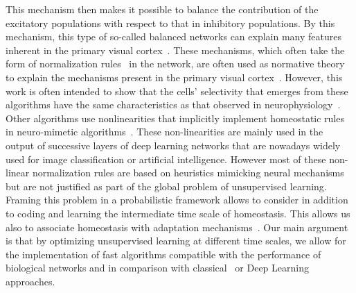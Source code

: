 \documentclass[a4paper, 11pt, draft]{article} %
\begin{document}
This mechanism then makes it possible to balance the contribution of the excitatory populations with respect to that in inhibitory populations. By this mechanism, this type of so-called balanced networks can explain many features inherent in the primary visual cortex~\citep{Hansel12}. These mechanisms, which often take the form of normalization rules~\citep{Schwartz01} in the network, are often used as normative theory to explain the mechanisms present in the primary visual cortex~\citep{Carandini12}. However, this work is often intended to show that the cells' selectivity that emerges from these algorithms have the same characteristics as that observed in neurophysiology~\citep{Ringach02,Rehn07, Loxley17}. Other algorithms use nonlinearities that implicitly implement homeostatic rules in neuro-mimetic algorithms~\citep{Brito16}. These non-linearities are mainly used in the output of successive layers of deep learning networks that are nowadays widely used for image classification or artificial intelligence. However most of these non-linear normalization rules are based on heuristics mimicking neural mechanisms but are not justified as part of the global problem of unsupervised learning. Framing this problem in a probabilistic framework allows to consider in addition to coding and learning the intermediate time scale of homeostasis. This allows us also to associate homeostasis with adaptation mechanisms~\citep{Rao99}. Our main argument is that by optimizing unsupervised learning at different time scales, we allow for the implementation of fast algorithms compatible with the performance of biological networks and in comparison with classical~\citep{Olshausen97} or Deep Learning approaches.
\end{document}

